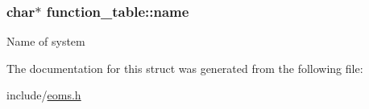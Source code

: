 \subsubsection[{name}]{\setlength{\rightskip}{0pt plus 5cm}char$\ast$ function\+\_\+table\+::name}\label{structfunction__table_a99650448c98f34476adf6caf60a22df2}
Name of system 

The documentation for this struct was generated from the following file\+:\begin{DoxyCompactItemize}
\item 
include/\hyperlink{eoms_8h}{eoms.\+h}\end{DoxyCompactItemize}
